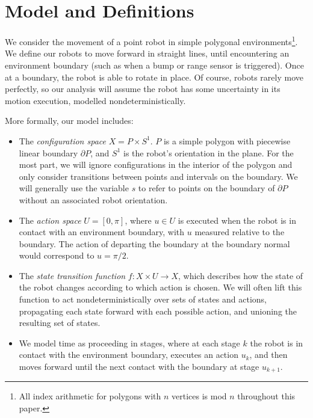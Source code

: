 \documentclass[]{styles/svproc}  %
\begin{document}
\section{Model and Definitions}

We consider the movement of a point robot in simple 
polygonal environments\footnote{All index arithmetic for polygons with $n$ vertices is mod $n$ 
throughout this paper.}. We define our robots to move forward in straight lines, until
encountering an environment boundary (such as when a bump or range sensor is
triggered). Once at a boundary, the robot is able to rotate in place.
Of course, robots rarely move perfectly, so our analysis will assume the
robot has some uncertainty in its motion execution, modelled
nondeterministically.

More formally, our model includes:

\begin{itemize}
\item The \emph{configuration space} $X = P \times S^1$. $P$ is a simple polygon with 
piecewise linear boundary $\partial P$, and $S^1$ is the robot's orientation in the plane. For the most part, we will ignore configurations in the interior
of the polygon and only consider transitions between points and intervals on the
boundary. We will generally use the variable $s$ to refer to points on
the boundary of $\partial P$ without an associated robot orientation.
\item The \emph{action space} $U = [0,\pi]$, where $u \in U$ is executed when
the robot is in contact with an environment boundary, with $u$ measured
relative to the boundary. The action of departing the boundary at the boundary
normal would correspond to $u = \pi/2$.
\item The \emph{state transition function} $f: X \times U \to X$, which
describes how the state of the robot changes according to which action is
chosen. We will often lift this function to act nondeterministically over sets
of states and actions, propagating each state forward with each possible action,
and unioning the resulting set of states. 
\item We model time as proceeding in stages, where at each stage $k$ the robot
is in contact with the environment boundary, executes an action $u_k$, and then
moves forward until the next contact with the boundary at stage $u_{k+1}$.
\end{itemize}
\end{document}
